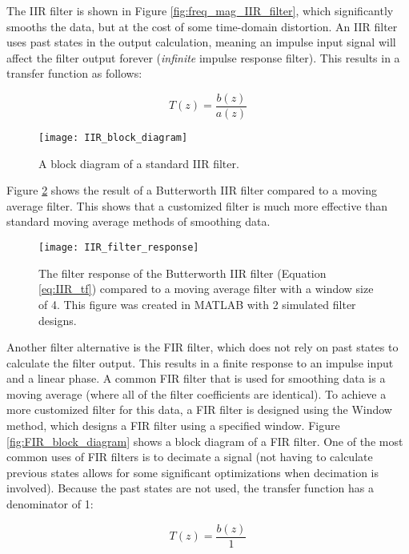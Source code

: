 The IIR filter is shown in Figure \ref{fig:freq_mag_IIR_filter}, which significantly smooths the data, but at the cost of some time-domain distortion.  An IIR filter uses past states in the output calculation, meaning an impulse input signal will affect the filter output forever (\textit{infinite} impulse response filter).  This results in a transfer function as follows:

\begin{equation} \label{eq:IIR_tf}
	T(z) = \frac{b(z)}{a(z)}
\end{equation}

\begin{figure}
	\centering
	\texttt{[image: IIR\_block\_diagram]}
	\decoRule
	\caption{A block diagram of a standard IIR filter. \cite{wiki:IIR_block_diagram}}
	\label{fig:IIR_block_diagram}
\end{figure}


Figure \ref{fig:IIR_filter_response} shows the result of a Butterworth IIR filter compared to a moving average filter.  This shows that a customized filter is much more effective than standard moving average methods of smoothing data.

\begin{figure}
	\centering
	\texttt{[image: IIR\_filter\_response]}
	\decoRule
	\caption{The filter response of the Butterworth IIR filter (Equation \ref{eq:IIR_tf}) compared to a moving average filter with a window size of 4.  This figure was created in MATLAB with 2 simulated filter designs.}
	\label{fig:IIR_filter_response}
\end{figure}


Another filter alternative is the FIR filter, which does not rely on past states to calculate the filter output.  This results in a finite response to an impulse input and a linear phase.  A common FIR filter that is used for smoothing data is a moving average (where all of the filter coefficients are identical).  To achieve a more customized filter for this data, a FIR filter is designed using the Window method, which designs a FIR filter using a specified window.  Figure \ref{fig:FIR_block_diagram} shows a block diagram of a FIR filter.  One of the most common uses of FIR filters is to decimate a signal (not having to calculate previous states allows for some significant optimizations when decimation is involved).  Because the past states are not used, the transfer function has a denominator of 1:

\begin{equation}
	T(z) = \frac{b(z)}{1}
\end{equation}

